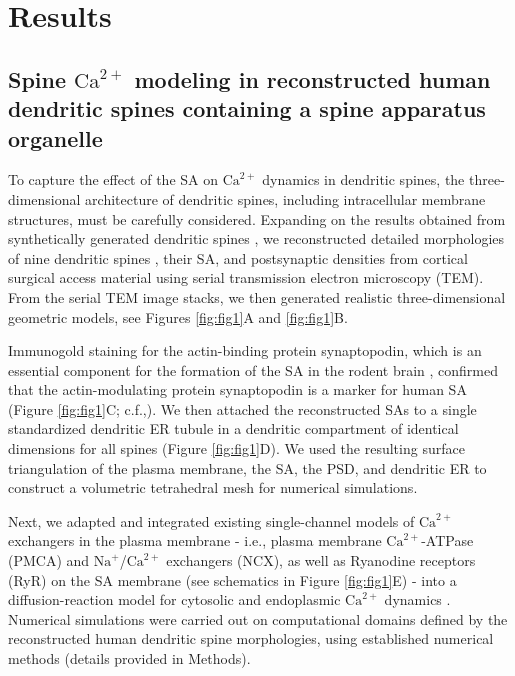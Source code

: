 \documentclass[12pt]{article}
\begin{document}
\section*{Results}
\subsection*{Spine $\textrm{Ca}^{2+}$ modeling in reconstructed human dendritic spines containing a spine apparatus organelle}
To capture the effect of the SA on $\textrm{Ca}^{2+}$ dynamics in dendritic spines, the three-dimensional architecture of dendritic spines, including intracellular membrane structures, must be carefully considered. Expanding on the results obtained from synthetically generated dendritic spines \cite{Breit2018}, we reconstructed detailed morphologies of nine dendritic spines%
, their SA, and postsynaptic densities from cortical surgical access material using serial transmission electron microscopy (TEM). From the serial TEM image stacks, we then generated realistic three-dimensional geometric models, see Figures \ref{fig:fig1}A and \ref{fig:fig1}B.

Immunogold staining for the actin-binding protein synaptopodin, which is an essential component for the formation of the SA in the rodent brain \cite{Deller2003}, confirmed that the actin-modulating protein synaptopodin is a marker for human SA (Figure \ref{fig:fig1}C; c.f.,\cite{Lenz2021}). We then attached the reconstructed SAs to a single standardized dendritic ER tubule in a dendritic compartment of identical dimensions for all spines (Figure \ref{fig:fig1}D). We used the resulting surface triangulation of the plasma membrane, the SA, the PSD, and dendritic ER to construct a volumetric tetrahedral mesh \cite{Si2015} for numerical simulations.

Next, we adapted and integrated existing single-channel models of $\textrm{Ca}^{2+}$ exchangers in the plasma membrane - i.e., plasma membrane $\textrm{Ca}^{2+}$-ATPase (PMCA) and $\textrm{Na}^{+}$/$\textrm{Ca}^{2+}$ exchangers (NCX), as well as Ryanodine receptors (RyR) on the SA membrane (see schematics in Figure \ref{fig:fig1}E) - into a diffusion-reaction model for cytosolic and endoplasmic $\textrm{Ca}^{2+}$ dynamics \cite{Breit2018}. Numerical simulations were carried out on computational domains defined by the reconstructed human dendritic spine morphologies, using established numerical methods (details provided in Methods).
\end{document}
